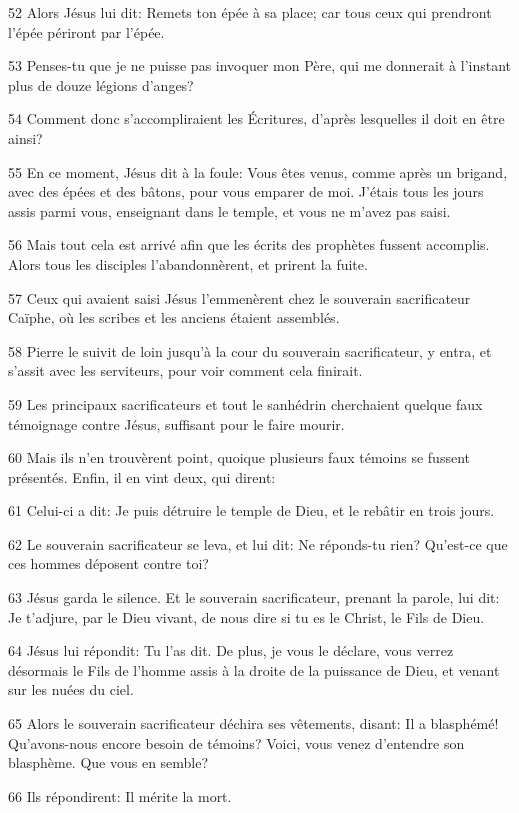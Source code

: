 \par 52 Alors Jésus lui dit: Remets ton épée à sa place; car tous ceux qui prendront l'épée périront par l'épée.
\par 53 Penses-tu que je ne puisse pas invoquer mon Père, qui me donnerait à l'instant plus de douze légions d'anges?
\par 54 Comment donc s'accompliraient les Écritures, d'après lesquelles il doit en être ainsi?
\par 55 En ce moment, Jésus dit à la foule: Vous êtes venus, comme après un brigand, avec des épées et des bâtons, pour vous emparer de moi. J'étais tous les jours assis parmi vous, enseignant dans le temple, et vous ne m'avez pas saisi.
\par 56 Mais tout cela est arrivé afin que les écrits des prophètes fussent accomplis. Alors tous les disciples l'abandonnèrent, et prirent la fuite.
\par 57 Ceux qui avaient saisi Jésus l'emmenèrent chez le souverain sacrificateur Caïphe, où les scribes et les anciens étaient assemblés.
\par 58 Pierre le suivit de loin jusqu'à la cour du souverain sacrificateur, y entra, et s'assit avec les serviteurs, pour voir comment cela finirait.
\par 59 Les principaux sacrificateurs et tout le sanhédrin cherchaient quelque faux témoignage contre Jésus, suffisant pour le faire mourir.
\par 60 Mais ils n'en trouvèrent point, quoique plusieurs faux témoins se fussent présentés. Enfin, il en vint deux, qui dirent:
\par 61 Celui-ci a dit: Je puis détruire le temple de Dieu, et le rebâtir en trois jours.
\par 62 Le souverain sacrificateur se leva, et lui dit: Ne réponds-tu rien? Qu'est-ce que ces hommes déposent contre toi?
\par 63 Jésus garda le silence. Et le souverain sacrificateur, prenant la parole, lui dit: Je t'adjure, par le Dieu vivant, de nous dire si tu es le Christ, le Fils de Dieu.
\par 64 Jésus lui répondit: Tu l'as dit. De plus, je vous le déclare, vous verrez désormais le Fils de l'homme assis à la droite de la puissance de Dieu, et venant sur les nuées du ciel.
\par 65 Alors le souverain sacrificateur déchira ses vêtements, disant: Il a blasphémé! Qu'avons-nous encore besoin de témoins? Voici, vous venez d'entendre son blasphème. Que vous en semble?
\par 66 Ils répondirent: Il mérite la mort.

